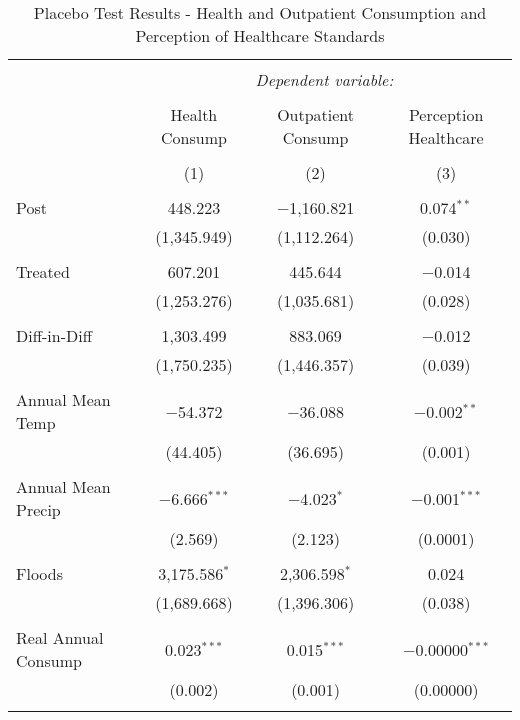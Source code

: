 
\begin{table}[!htbp] \centering 
  \caption{Placebo Test Results - Health and Outpatient Consumption and Perception of Healthcare Standards} 
  \label{} 
\begin{tabular}{@{\extracolsep{5pt}}lccc} 
\\[-1.8ex]\hline 
\hline \\[-1.8ex] 
 & \multicolumn{3}{c}{\textit{Dependent variable:}} \\ 
\cline{2-4} 
\\[-1.8ex] & Health Consump & Outpatient Consump & Perception Healthcare \\ 
\\[-1.8ex] & (1) & (2) & (3)\\ 
\hline \\[-1.8ex] 
 Post & 448.223 & $-$1,160.821 & 0.074$^{**}$ \\ 
  & (1,345.949) & (1,112.264) & (0.030) \\ 
  & & & \\ 
 Treated & 607.201 & 445.644 & $-$0.014 \\ 
  & (1,253.276) & (1,035.681) & (0.028) \\ 
  & & & \\ 
 Diff-in-Diff & 1,303.499 & 883.069 & $-$0.012 \\ 
  & (1,750.235) & (1,446.357) & (0.039) \\ 
  & & & \\ 
 Annual Mean Temp & $-$54.372 & $-$36.088 & $-$0.002$^{**}$ \\ 
  & (44.405) & (36.695) & (0.001) \\ 
  & & & \\ 
 Annual Mean Precip & $-$6.666$^{***}$ & $-$4.023$^{*}$ & $-$0.001$^{***}$ \\ 
  & (2.569) & (2.123) & (0.0001) \\ 
  & & & \\ 
 Floods & 3,175.586$^{*}$ & 2,306.598$^{*}$ & 0.024 \\ 
  & (1,689.668) & (1,396.306) & (0.038) \\ 
  & & & \\ 
 Real Annual Consump & 0.023$^{***}$ & 0.015$^{***}$ & $-$0.00000$^{***}$ \\ 
  & (0.002) & (0.001) & (0.00000) \\ 
  & & & \\ 

\end{tabular}
\end{table}
